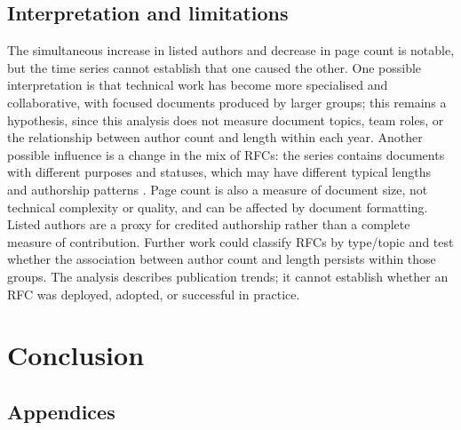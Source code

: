 \documentclass{l4proj}
\begin{document}
\section{Interpretation and limitations}
The simultaneous increase in listed authors and decrease in page count is notable, but the time series cannot establish that one caused the other. One possible interpretation is that technical work has become more specialised and collaborative, with focused documents produced by larger groups; this remains a hypothesis, since this analysis does not measure document topics, team roles, or the relationship between author count and length within each year. Another possible influence is a change in the mix of RFCs: the series contains documents with different purposes and statuses, which may have different typical lengths and authorship patterns \cite{IETFProcessRFCs}. Page count is also a measure of document size, not technical complexity or quality, and can be affected by document formatting. Listed authors are a proxy for credited authorship rather than a complete measure of contribution. Further work could classify RFCs by type/topic and test whether the association between author count and length persists within those groups. The analysis describes publication trends; it cannot establish whether an RFC was deployed, adopted, or successful in practice.

\chapter{Conclusion}

%
% 

\begin{appendices}

\chapter{Appendices}



\end{appendices}





\renewcommand{\thechapter}{0} 

\end{document}
